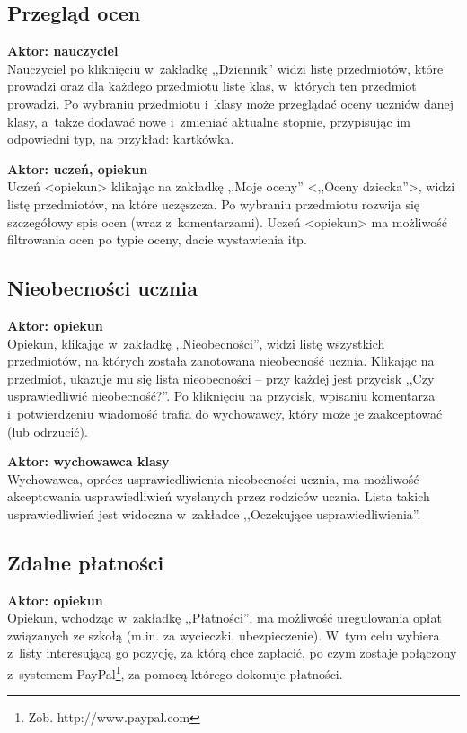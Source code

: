 \documentclass[12pt,leqno,twoside]{mwart}
\begin{document}
\subsection{Przegląd ocen}
\begin{description}
\item \textbf{Aktor: nauczyciel}\\
Nauczyciel po kliknięciu w~zakładkę ,,Dziennik'' widzi listę przedmiotów, które prowadzi oraz dla każdego przedmiotu listę klas, w~których ten przedmiot prowadzi. Po wybraniu przedmiotu i~klasy może przeglądać oceny uczniów danej klasy, a~także dodawać nowe i~zmieniać aktualne stopnie, przypisując im odpowiedni typ, na przykład: kartkówka.\\
\item \textbf{Aktor: uczeń, opiekun}\\
Uczeń <opiekun> klikając na zakładkę ,,Moje oceny'' <,,Oceny dziecka''>, widzi listę przedmiotów, na które uczęszcza. Po wybraniu przedmiotu rozwija się szczegółowy spis ocen (wraz z~komentarzami). Uczeń <opiekun> ma możliwość filtrowania ocen po typie oceny, dacie wystawienia itp.
\end{description}

\subsection{Nieobecności ucznia}
\begin{description}
\item \textbf{Aktor: opiekun}\\
Opiekun, klikając w~zakładkę ,,Nieobecności'', widzi listę wszystkich przedmiotów, na których została zanotowana nieobecność ucznia. Klikając na przedmiot, ukazuje mu się lista nieobecności -- przy każdej jest przycisk ,,Czy usprawiedliwić nieobecność?''. Po kliknięciu na przycisk, wpisaniu komentarza i~potwierdzeniu wiadomość trafia do wychowawcy, który może je zaakceptować (lub odrzucić).\\
\item \textbf{Aktor: wychowawca klasy}\\
Wychowawca, oprócz usprawiedliwienia nieobecności ucznia, ma możliwość akceptowania usprawiedliwień wysłanych przez rodziców ucznia. Lista takich usprawiedliwień jest widoczna w~zakładce ,,Oczekujące usprawiedliwienia''.
\end{description}

\subsection{Zdalne płatności}
\begin{description}
\item \textbf{Aktor: opiekun}\\
Opiekun, wchodząc w~zakładkę ,,Płatności'', ma możliwość uregulowania opłat związanych ze szkołą (m.in. za wycieczki, ubezpieczenie). W~tym celu wybiera z~listy interesującą go pozycję, za którą chce zapłacić, po czym zostaje połączony z~systemem PayPal\footnote{Zob. http://www.paypal.com}, za pomocą którego dokonuje płatności.
\end{description}
\end{document}
